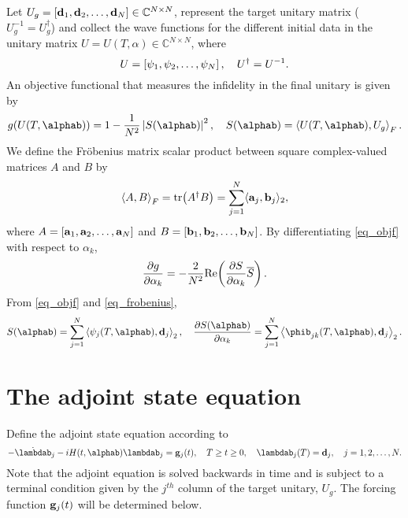 \documentclass[11pt]{article}
\begin{document}
Let $U_g = [{\mathbf d}_1, {\mathbf d}_2, \ldots, {\mathbf d}_N]\in \mathbb{C}^{N\times N}$, represent the target unitary
matrix ($U_g^{-1} = U_g^\dag$) and collect the wave functions for the different initial data in the
unitary matrix $U = U(T,\alpha) \in \mathbb C^{N\times N}$, where
\[
U = \left[ {\mathbf \psi}_1, {\mathbf \psi}_2, \ldots, {\mathbf \psi}_N \right],\quad U^\dag = U^{-1}.
\]
An objective functional that measures the infidelity in the final unitary is given by
\begin{equation}\label{eq_objf}
g(U(T,\alphab)) = 1 - \frac{1}{N^2} \left| S(\alphab) \right|^2,\quad S(\alphab) = \left\langle U(T,\alphab), U_g \right\rangle_F.
\end{equation}
We define the Fr\"obenius matrix scalar product between square complex-valued matrices $A$ and $B$ by
\begin{equation}\label{eq_frobenius}
\left\langle A, B\right\rangle_F = \mbox{tr$\left( A^\dag B\right)$} = \sum_{j=1}^N \langle {\mathbf a}_j, {\mathbf b}_j\rangle_2,
\end{equation}
where $A=[{\mathbf a}_1, {\mathbf a}_2, \ldots, {\mathbf a}_N]$ and  $B=[{\mathbf b}_1, {\mathbf b}_2, \ldots, {\mathbf b}_N]$. By differentiating
\eqref{eq_objf} with respect to $\alpha_k$,
\begin{equation}\label{eq_obj-grad}
\frac{\partial g}{\partial \alpha_k} = - \frac{2}{N^2} {\rm Re}\! \left(\frac{\partial S}{\partial \alpha_k} \overline{S} \right).
\end{equation}
From \eqref{eq_objf} and \eqref{eq_frobenius},
\begin{equation} \label{eq_s-derivative}
  S(\alphab) = \sum_{j=1}^N \left\langle \psib_j(T,\alphab), \db_j \right\rangle_2,\quad
  \frac{\p S(\alphab)}{\p \alpha_k} = \sum_{j=1}^N \left\langle \phib_{jk}(T,\alphab), \db_j \right\rangle_2.
\end{equation}

\section{The adjoint state equation}
Define the adjoint state equation according to
\begin{equation}\label{eq_adjoint}
-\dot{\lambdab}_j - iH(t,\alphab)\lambdab_j=\gb_j(t),\quad T\geq t\geq 0, \quad \lambdab_j(T)=\db_j,\quad j=1,2,\ldots,N.
\end{equation}
Note that the adjoint equation is solved backwards in time and is subject to a terminal condition
given by the $j^{th}$ column of the target unitary, $U_g$. The forcing function ${\mathbf g}_j(t)$ will be
determined below.
\end{document}
